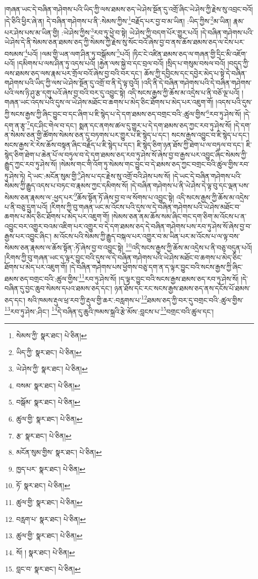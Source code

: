 །གཞན་ཡང་དེ་བཞིན་གཤེགས་པའི་ཡིད་ཀྱི་ལས་ཐམས་ཅད་ཡེ་ཤེས་སྔོན་དུ་འགྲོ་ཞིང་ཡེ་ཤེས་ཀྱི་རྗེས་སུ་འབྲང་བའོ། །དེ་ཅིའི་ཕྱིར་ཞེ་ན། དེ་བཞིན་གཤེགས་པ་ནི་:སེམས་ཀྱིས་\footnote{སེམས་ཀྱི་  སྣར་ཐང་།  པེ་ཅིན། }བརྗོད་པར་བྱ་བ་མ་ཡིན། :ཡིད་ཀྱིས་\footnote{ཡིད་ཀྱི་  སྣར་ཐང་།  པེ་ཅིན། }མ་ཡིན། རྣམ་པར་ཤེས་པས་མ་ཡིན་གྱི། :ཡེ་ཤེས་ཀྱིས་\footnote{ཡེ་ཤེས་ཀྱི་  སྣར་ཐང་།  པེ་ཅིན། }རབ་ཏུ་ཕྱེ་བ་སྟེ། ཡེ་ཤེས་ཀྱི་བདག་པོར་གྱུར་པའོ། །དེ་བཞིན་གཤེགས་པའི་ཡེ་ཤེས་དེ་ནི་སེམས་ཅན་ཐམས་ཅད་ཀྱི་སེམས་ཀྱི་རྗེས་སུ་སོང་བའོ་ཞེས་བྱ་བ་ནས་ཆོས་ཐམས་ཅད་ལ་ངེས་པར་བསམས་\footnote{བསམ་  སྣར་ཐང་།  པེ་ཅིན། }པའོ། །ལམ་གྱི་ཡན་ལག་ཤིན་ཏུ་བསྒོམས་\footnote{བསྒོམ་  སྣར་ཐང་།  པེ་ཅིན། }པའོ། །ཏིང་ངེ་འཛིན་ཐམས་ཅད་ལ་གཞན་གྱི་དྲིང་མི་འཇོག་པའོ། །དམིགས་པ་ལས་ཤིན་ཏུ་འདས་པའོ། །རྐྱེན་ལས་སྐྱེ་བ་དང་བྲལ་བའོ། །སྲིད་པ་གསུམ་བསལ་བའོ། །བདུད་ཀྱི་ལས་ཐམས་ཅད་ལས་རྣམ་པར་གྲོལ་བའོ་ཞེས་བྱ་བའི་བར་དང་། ཆོས་ཀྱི་དབྱིངས་དང་དབྱེར་མེད་པ་སྟེ་དེ་བཞིན་གཤེགས་པའི་ཡིད་ཀྱི་ལས་ཡེ་ཤེས་སྔོན་དུ་འགྲོ་བ་ནི་དེ་ལྟ་བུའོ། །འདི་ནི་དེ་བཞིན་གཤེགས་པའི་དེ་བཞིན་གཤེགས་པའི་ལས་ཉི་ཤུ་རྩ་དགུ་པའོ་ཞེས་བྱ་བའི་བར་དུ་འབྱུང་སྟེ། འདི་སངས་རྒྱས་ཀྱི་ཆོས་མ་འདྲེས་པ་ནི་བཅོ་ལྔ་པའོ། །གཞན་ཡང་འདས་པའི་དུས་ལ་ཡེ་ཤེས་མཐོང་བ་ཆགས་པ་མེད་ཅིང་ཐོགས་པ་མེད་པར་འཇུག་གོ། །འདས་པའི་དུས་ཀྱི་སངས་རྒྱས་ཀྱི་ཞིང་བྱུང་བ་དང་ཞིག་པ་ཇི་སྙེད་པ་དེ་དག་ཐམས་ཅད་བགྲང་བའི་:ཚུལ་གྱིས་\footnote{ཚུལ་གྱི་  སྣར་ཐང་།  པེ་ཅིན། }རབ་ཏུ་ཤེས་སོ། །དེ་དག་ན་རྩྭ་\footnote{རྩ་  སྣར་ཐང་།  པེ་ཅིན། }དང་ཤིང་གེལ་བ་དང་། སྨན་དང་ནགས་ཚལ་དུ་གྱུར་པ་དེ་དག་ཐམས་ཅད་ཀྱང་རབ་ཏུ་ཤེས་སོ། །དེ་དག་ན་སེམས་ཅན་གྱི་ཚོགས་སེམས་ཅན་དུ་བཏགས་པར་གྱུར་པ་ཇི་སྙེད་པ་དང་། སངས་རྒྱས་འབྱུང་བ་ཇི་སྙེད་པ་དང་། སངས་རྒྱས་རེ་རེས་ཆོས་བསྟན་ཞིང་བརྗོད་པ་ཇི་སྙེད་པ་དང་། ཇི་སྙེད་ཅིག་ཉན་ཐོས་ཀྱི་ཐེག་པ་ལ་བཏུལ་བ་དང་། ཇི་སྙེད་ཅིག་ཐེག་པ་ཆེན་པོ་ལ་བཏུལ་བ་དེ་དག་ཐམས་ཅད་རབ་ཏུ་ཤེས་སོ་ཞེས་བྱ་བ་རྒྱས་པར་འབྱུང་ཞིང་སེམས་ཀྱི་རྒྱུད་ཀྱང་རབ་ཏུ་ཤེས་སོ། །སེམས་གང་གི་འོག་ཏུ་སེམས་གང་བྱུང་བ་དེ་ཐམས་ཅད་ཀྱང་བགྲང་བའི་ཚུལ་གྱིས་རབ་ཏུ་ཤེས་ཏེ། དེ་ཡང་:མངོན་སུམ་གྱི་\footnote{མངོན་སུམ་གྱིས་  སྣར་ཐང་།  པེ་ཅིན། }ཤེས་པ་དང་རྗེས་སུ་འགྲོ་བའི་ཤེས་པས་སོ། །དེ་ཡང་དེ་བཞིན་གཤེགས་པའི་སེམས་ཀྱི་རྒྱུད་འདས་པ་བཏང་བ་རྣམས་ཀྱང་དམིགས་སོ། །དེ་བཞིན་གཤེགས་པ་ནི་ཡེ་ཤེས་དེ་ལྟ་བུ་དང་ལྡན་པས་སེམས་ཅན་རྣམས་ལ་:ཕྱད་པར་\footnote{ཁྱད་པར་  སྣར་ཐང་།  པེ་ཅིན། }ཆོས་སྟོན་ཏོ་ཞེས་བྱ་བ་ལ་སོགས་པ་འབྱུང་སྟེ། འདི་སངས་རྒྱས་ཀྱི་ཆོས་མ་འདྲེས་པ་ནི་བཅུ་དྲུག་པའོ། །རིགས་ཀྱི་བུ་གཞན་ཡང་མ་འོངས་པའི་དུས་ལ་དེ་བཞིན་གཤེགས་པའི་ཡེ་ཤེས་མཐོང་བ་ཆགས་པ་མེད་ཅིང་ཐོགས་པ་མེད་པར་འཇུག་གོ། །སེམས་ཅན་ནམ་ཆོས་སམ་ཞིང་གང་དག་ཅིག་མ་འོངས་པ་ན་འབྱུང་བར་འགྱུར་བའམ་འཇིག་པར་འགྱུར་བ་དེ་དག་ཐམས་ཅད་དེ་བཞིན་གཤེགས་པས་རབ་ཏུ་ཤེས་སོ་ཞེས་བྱ་བ་རྒྱས་པར་འབྱུང་ཞིང་། མ་འོངས་པའི་སེམས་ཀྱི་རྒྱུད་བསྐལ་པར་འགྱུར་བ་མ་ཡིན་པར་མ་འོངས་པ་ལ་ལྟ་བས་སེམས་ཅན་རྣམས་ལ་ཆོས་སྟོན་:ཏོ་ཞེས་བྱ་བ་འབྱུང་སྟེ། \footnote{ཏོ་  སྣར་ཐང་།  པེ་ཅིན། }འདི་སངས་རྒྱས་ཀྱི་ཆོས་མ་འདྲེས་པ་ནི་བཅུ་བདུན་པའོ། །རིགས་ཀྱི་བུ་གཞན་ཡང་ད་ལྟར་བྱུང་བའི་དུས་ལ་དེ་བཞིན་གཤེགས་པའི་ཡེ་ཤེས་མཐོང་བ་ཆགས་པ་མེད་ཅིང་ཐོགས་པ་མེད་པར་འཇུག་གོ། །དེ་བཞིན་གཤེགས་པས་ཕྱོགས་བཅུ་དག་ན་ད་ལྟར་བྱུང་བའི་སངས་རྒྱས་ཀྱི་ཞིང་ཐམས་ཅད་བགྲང་བའི་:ཚུལ་གྱིས་\footnote{ཚུལ་གྱི་  སྣར་ཐང་།  པེ་ཅིན། }རབ་ཏུ་ཤེས་སོ། །ད་ལྟར་བྱུང་བའི་སངས་རྒྱས་ཐམས་ཅད་རབ་ཏུ་ཤེས་སོ། །དེ་བཞིན་དུ་བྱང་ཆུབ་སེམས་དཔའ་ཐམས་ཅད་དང་། ཉན་ཐོས་དང་རང་སངས་རྒྱས་ཐམས་ཅད་ནས་དངོས་པོ་ཐམས་ཅད་དང་། སའི་ཁམས་རྡུལ་ཕྲ་རབ་ཀྱི་རྡུལ་གྱི་ཆར་:བརླགས་པ་\footnote{བརླག་པ་  སྣར་ཐང་།  པེ་ཅིན། }ཐམས་ཅད་ཀྱི་བར་དུ་བགྲང་བའི་:ཚུལ་གྱིས་\footnote{ཚུལ་གྱི་  སྣར་ཐང་།  པེ་ཅིན། }རབ་ཏུ་ཤེས་:ཤིང་། \footnote{སོ། །   སྣར་ཐང་།  པེ་ཅིན། }དེ་བཞིན་དུ་ཆུའི་ཁམས་སྐྲའི་རྩེ་མོས་:བླངས་པ་\footnote{བླང་བ་  སྣར་ཐང་།  པེ་ཅིན། }བགྲང་བའི་ཚུལ་དང་། 